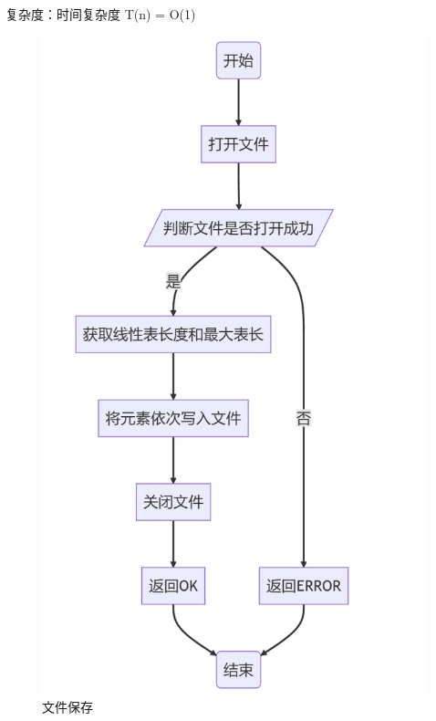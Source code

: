 \documentclass[supercite]{Experimental_Report}
\theoremstyle{definition}
\begin{document}
\begin{enumerate}
	复杂度：时间复杂度 T(n) = O(1)
	\begin{figure}[htbp]
	\centering
	\begin{minipage}{0.7\linewidth}
		\centering
		\includegraphics[width=0.9\linewidth]{images/文件保存.png}
	\end{minipage}
	\caption{文件保存}
	\label{fig1-5}
\end{figure}


\end{enumerate}
\end{document}

